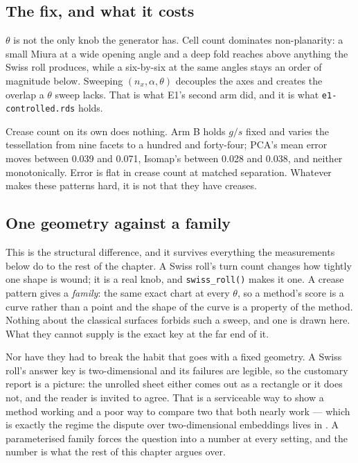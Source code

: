 \documentclass[
  british,
  a4paper,
]{book}
\begin{document}
\subsection{The fix, and what it costs}\label{the-fix-and-what-it-costs}

\(\theta\) is not the only knob the generator has. Cell count dominates
non-planarity: a small Miura at a wide opening angle and a deep fold reaches
above anything the Swiss roll produces, while a six-by-six at the same angles
stays an order of magnitude below. Sweeping \((n_x, \alpha, \theta)\) decouples the
axes and creates the overlap a \(\theta\) sweep lacks. That is what E1's second arm
did, and it is what \texttt{e1-controlled.rds} holds.

Crease count on its own does nothing. Arm B holds \(g/s\) fixed and varies the
tessellation from nine facets to a hundred and forty-four; PCA's mean error moves
between
0.039
and
0.071,
Isomap's between
0.028
and
0.038,
and neither monotonically. Error is flat in crease count at matched separation.
Whatever makes these patterns hard, it is not that they have creases.

\subsection{One geometry against a family}\label{one-geometry-against-a-family}

This is the structural difference, and it survives everything the measurements
below do to the rest of the chapter. A Swiss roll's turn count changes how
tightly one shape is wound; it is a real knob, and \texttt{swiss\_roll()} makes it one. A
crease pattern gives a \emph{family}: the same exact chart at every \(\theta\), so a
method's score is a curve rather than a point and the shape of the curve is a
property of the method. Nothing about the classical surfaces forbids such a
sweep, and one is drawn here. What they cannot supply is the exact key at the far
end of it.

Nor have they had to break the habit that goes with a fixed geometry. A Swiss
roll's answer key is two-dimensional and its failures are legible, so the
customary report is a picture: the unrolled sheet either comes out as a rectangle
or it does not, and the reader is invited to agree. That is a serviceable way to
show a method working and a poor way to compare two that both nearly work --- which
is exactly the regime the dispute over two-dimensional embeddings lives in
\citep{chari2023specious, lause2024elephant}. A parameterised family forces the
question into a number at every setting, and the number is what the rest of this
chapter argues over.
\end{document}
